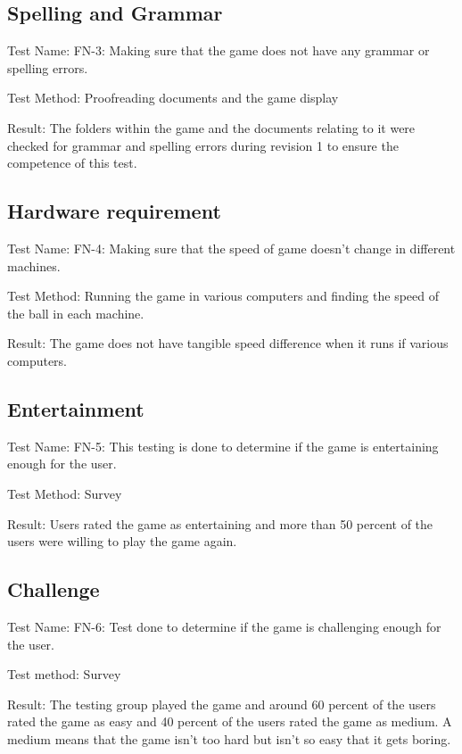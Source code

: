 \documentclass{article}
\begin{document}
\vspace{5mm}


\subsection {Spelling and Grammar}
Test Name: FN-3: Making sure that the game does not have any grammar or spelling errors. \par
Test Method: Proofreading documents and the game display \par
Result: The folders within the game and the documents relating to it were checked for grammar and spelling errors during revision 1 to ensure the competence of this test. \par

\vspace{5mm}


\subsection {Hardware requirement}
Test Name: FN-4: Making sure that the speed of game doesn’t change in diﬀerent machines. \par
Test Method: Running the game in various computers and finding the speed of the ball in each machine. \par
Result: The game does not have tangible speed difference when it runs if various computers. \par

\vspace{5mm}


\subsection { Entertainment}
Test Name: FN-5: This testing is done to determine if the game is entertaining enough for the user. \par
Test Method: Survey \par
Result: Users rated the game as entertaining and more than 50 percent of the users were willing to play the game again. \par

\vspace{5mm}


\subsection {Challenge}
Test Name: FN-6: Test done to determine if the game is challenging enough for the user. \par
Test method: Survey \par
Result: The testing group played the game and around 60 percent of the users rated the game as easy and 40 percent of the users rated the game as medium. A medium means that the game isn’t too hard but isn’t so easy that it gets boring. \par
\end{document}

